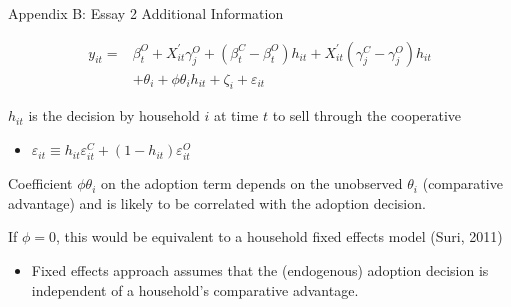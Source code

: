 \documentclass[aspectratio=169]{beamer}
\newenvironment{wideitemize}{\itemize\addtolength{\itemsep}{10pt}}{\enditemize}
\begin{document}
\begin{frame}{Appendix B: Essay 2 Additional Information}

\addtocounter{equation}{-1}
\begin{equation} \label{eq:E2_spec}
    \begin{split}
    y_{it} = & \beta^{O}_{t} + X^{\prime}_{it}\gamma^{O}_{j} + (\beta^{C}_{t} - \beta^{O}_{t})h_{it} +  X^{\prime}_{it}(\gamma^{C}_{j} - \gamma^{O}_{j})h_{it} \\
    & + \theta_{i} + \phi\theta_{i}h_{it} + \zeta_i + \varepsilon_{it}
    \end{split}
\end{equation}

\begin{wideitemize}
    \item $h_{it}$ is the decision by household $i$ at time $t$ to sell through the cooperative
        \begin{itemize}
            \item $\varepsilon_{it} \equiv h_{it}\varepsilon^{C}_{it} + (1-h_{it})\varepsilon^{O}_{it}$
        \end{itemize}
    \item Coefficient $\phi\theta_{i}$ on the adoption term depends on the unobserved $\theta_{i}$ (comparative advantage) and is likely to be correlated with the adoption decision. 
    \item If $\phi = 0$, this would be equivalent to a household fixed effects model (Suri, 2011)
        \begin{itemize}
            \item Fixed effects approach assumes that the (endogenous) adoption decision is independent of a household’s comparative advantage.
        \end{itemize}
\end{wideitemize}
\end{frame}
\end{document}
